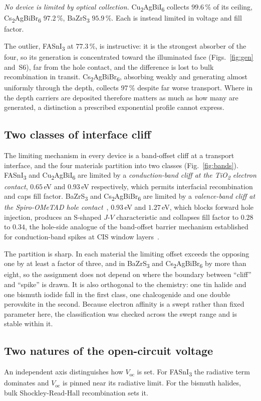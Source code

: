 \documentclass[lettersize,journal]{IEEEtran}
\newcommand{\FASnI}{FASnI\textsubscript{3}}
\newcommand{\CABI}{Cu\textsubscript{2}AgBiI\textsubscript{6}}
\newcommand{\BZS}{BaZrS\textsubscript{3}}
\newcommand{\CABB}{Cs\textsubscript{2}AgBiBr\textsubscript{6}}
\newcommand{\TiOx}{TiO\textsubscript{2}}
\begin{document}
\emph{No device is limited by optical collection.} \CABI{} collects
$99.6\,\%$ of its ceiling, \CABB{} $97.2\,\%$, \BZS{} $95.9\,\%$. Each is
instead limited in voltage and fill factor.

The outlier, \FASnI{} at $77.3\,\%$, is instructive: it is the strongest
absorber of the four, so its generation is concentrated toward the
illuminated face (Figs.~\ref{fig:gen} and~S6), far from the hole contact,
and the difference is lost to bulk recombination in transit. \CABB,
absorbing weakly and generating almost uniformly through the depth, collects
$97\,\%$ despite far worse transport. Where in the depth carriers are
deposited therefore matters as much as how many are generated, a
distinction a prescribed exponential profile cannot express.

\subsection{Two classes of interface cliff}
The limiting mechanism in every device is a band-offset cliff at a transport
interface, and the four materials partition into two classes
(Fig.~\ref{fig:bands}). \FASnI{} and \CABI{} are limited by a
\emph{conduction-band cliff at the \TiOx{} electron contact}, $0.65\,$eV and
$0.93\,$eV respectively, which permits interfacial recombination and caps fill
factor. \BZS{} and \CABB{} are limited by a \emph{valence-band cliff at the
Spiro-OMeTAD hole contact}~\cite{eya_dzade}, $0.93\,$eV and $1.27\,$eV, which blocks forward
hole injection, produces an S-shaped $J$-$V$ characteristic and collapses
fill factor to $0.28$ to $0.34$, the hole-side analogue of the band-offset
barrier mechanism established for conduction-band spikes at CIS window
layers~\cite{minemoto2001}.


The partition is sharp. In each material the limiting offset exceeds the
opposing one by at least a factor of three, and in \BZS{} and \CABB{} by more
than eight, so the assignment does not depend on where the boundary between
``cliff'' and ``spike'' is drawn. It is also orthogonal to the chemistry: one
tin halide and one bismuth iodide fall in the first class, one chalcogenide
and one double perovskite in the second. Because electron affinity is a swept
rather than fixed parameter here, the classification was checked across the
swept range and is stable within it.

\subsection{Two natures of the open-circuit voltage}
An independent axis distinguishes how $V_\mathrm{oc}$ is set. For \FASnI{} the
radiative term dominates and $V_\mathrm{oc}$ is pinned near its radiative
limit. For the bismuth halides, bulk Shockley-Read-Hall recombination sets
it.
\end{document}
